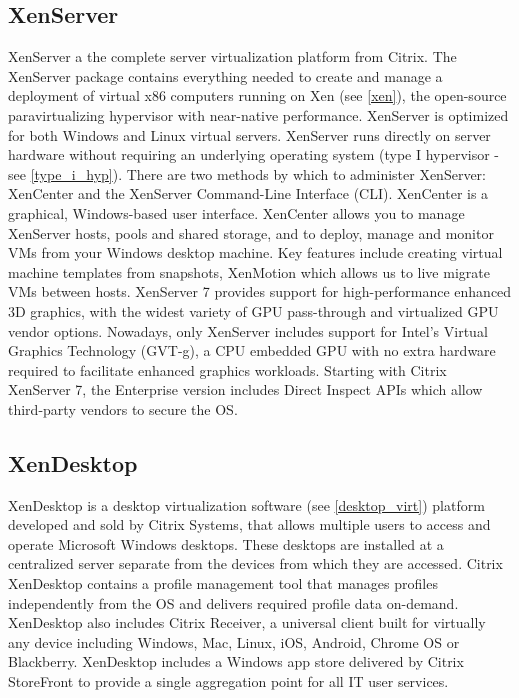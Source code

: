 \subsection{XenServer}
XenServer a the complete server virtualization platform from Citrix. The XenServer package contains everything needed to create and manage a deployment of virtual x86 computers running on Xen (see \ref{xen}), the open-source paravirtualizing hypervisor with near-native performance. XenServer is optimized for both Windows and Linux virtual servers. XenServer runs directly on server hardware without requiring an underlying operating system (type I hypervisor - see \ref{type_i_hyp}). There are two methods by which to administer XenServer: XenCenter and the XenServer Command-Line Interface (CLI). XenCenter is a graphical, Windows-based user interface. XenCenter allows you to manage XenServer hosts, pools and shared storage, and to deploy, manage and monitor VMs from your Windows desktop machine. Key features include creating virtual machine templates from snapshots, XenMotion which allows us to live migrate VMs between hosts. XenServer 7 provides support for high-performance enhanced 3D graphics, with the widest variety of GPU pass-through and virtualized GPU vendor options. Nowadays, only XenServer includes support for Intel’s Virtual Graphics Technology (GVT-g), a CPU embedded GPU with no extra hardware required to facilitate enhanced graphics workloads. Starting with Citrix XenServer 7, the Enterprise version includes Direct Inspect APIs which allow third-party vendors to secure the OS.

\subsection{XenDesktop}
XenDesktop is a desktop virtualization software (see \ref{desktop_virt}) platform developed and sold by Citrix Systems, that allows multiple users to access and operate Microsoft Windows desktops. These desktops are installed at a centralized server separate from the devices from which they are accessed. Citrix XenDesktop contains a profile management tool that manages profiles independently from the OS and delivers required profile data on-demand. XenDesktop also includes Citrix Receiver, a universal client built for virtually any device including Windows, Mac, Linux, iOS, Android, Chrome OS or Blackberry. XenDesktop includes a Windows app store delivered by Citrix StoreFront to provide a single aggregation point for all IT user services.

